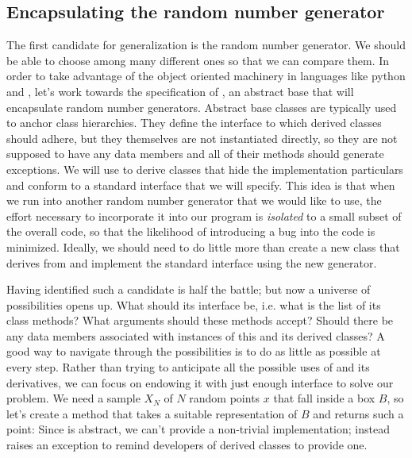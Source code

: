 \subsection{Encapsulating the random number generator}
\label{sec:classes:random}

The first candidate for generalization is the random number generator. We should be able to
choose among many different ones so that we can compare them. In order to take advantage of the
object oriented machinery in languages like python and \cpp, let's work towards the
specification of , an abstract base that will encapsulate random number
generators. Abstract base classes are typically used to anchor class hierarchies. They define
the interface to which derived classes should adhere, but they themselves are not instantiated
directly, so they are not supposed to have any data members and all of their methods should
generate exceptions. We will use  to derive classes that hide the implementation
particulars and conform to a standard interface that we will specify.  This idea is that when
we run into another random number generator that we would like to use, the effort necessary to
incorporate it into our program is {\em isolated} to a small subset of the overall code, so
that the likelihood of introducing a bug into the code is minimized.  Ideally, we should need
to do little more than create a new class that derives from  and implement the
standard interface using the new generator.

Having identified such a candidate is half the battle; but now a universe of possibilities
opens up. What should its interface be, i.e. what is the list of its class methods? What
arguments should these methods accept? Should there be any data members associated with
instances of this and its derived classes? A good way to navigate through the possibilities is
to do as little as possible at every step. Rather than trying to anticipate all the possible
uses of  and its derivatives, we can focus on endowing it with just enough
interface to solve our problem. We need a sample $X_{N}$ of $N$ random points $x$ that fall inside
a box $B$, so let's create a method  that takes a suitable representation of $B$
and returns such a point:
%
%
Since  is abstract, we can't provide a non-trivial implementation; instead
 raises an exception to remind developers of derived classes to provide one.

